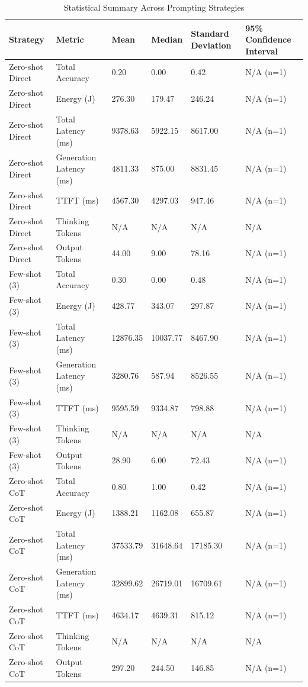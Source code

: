 \begin{table}
\caption{Statistical Summary Across Prompting Strategies}
\label{tab:statistical_summary}
\begin{tabular}{llllll}
\toprule
Strategy & Metric & Mean & Median & Standard Deviation & 95\% Confidence Interval \\
\midrule
Zero-shot Direct & Total Accuracy & 0.20 & 0.00 & 0.42 & N/A (n=1) \\
Zero-shot Direct & Energy (J) & 276.30 & 179.47 & 246.24 & N/A (n=1) \\
Zero-shot Direct & Total Latency (ms) & 9378.63 & 5922.15 & 8617.00 & N/A (n=1) \\
Zero-shot Direct & Generation Latency (ms) & 4811.33 & 875.00 & 8831.45 & N/A (n=1) \\
Zero-shot Direct & TTFT (ms) & 4567.30 & 4297.03 & 947.46 & N/A (n=1) \\
Zero-shot Direct & Thinking Tokens & N/A & N/A & N/A & N/A \\
Zero-shot Direct & Output Tokens & 44.00 & 9.00 & 78.16 & N/A (n=1) \\
Few-shot (3) & Total Accuracy & 0.30 & 0.00 & 0.48 & N/A (n=1) \\
Few-shot (3) & Energy (J) & 428.77 & 343.07 & 297.87 & N/A (n=1) \\
Few-shot (3) & Total Latency (ms) & 12876.35 & 10037.77 & 8467.90 & N/A (n=1) \\
Few-shot (3) & Generation Latency (ms) & 3280.76 & 587.94 & 8526.55 & N/A (n=1) \\
Few-shot (3) & TTFT (ms) & 9595.59 & 9334.87 & 798.88 & N/A (n=1) \\
Few-shot (3) & Thinking Tokens & N/A & N/A & N/A & N/A \\
Few-shot (3) & Output Tokens & 28.90 & 6.00 & 72.43 & N/A (n=1) \\
Zero-shot CoT & Total Accuracy & 0.80 & 1.00 & 0.42 & N/A (n=1) \\
Zero-shot CoT & Energy (J) & 1388.21 & 1162.08 & 655.87 & N/A (n=1) \\
Zero-shot CoT & Total Latency (ms) & 37533.79 & 31648.64 & 17185.30 & N/A (n=1) \\
Zero-shot CoT & Generation Latency (ms) & 32899.62 & 26719.01 & 16709.61 & N/A (n=1) \\
Zero-shot CoT & TTFT (ms) & 4634.17 & 4639.31 & 815.12 & N/A (n=1) \\
Zero-shot CoT & Thinking Tokens & N/A & N/A & N/A & N/A \\
Zero-shot CoT & Output Tokens & 297.20 & 244.50 & 146.85 & N/A (n=1) \\

\end{tabular}
\end{table}
